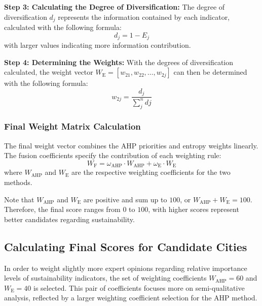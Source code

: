 \documentclass{mcmthesis}
\begin{document}
\textbf{Step 3: Calculating the Degree of Diversification:} The degree of diversification $d_j$ represents the information contained by each indicator, calculated with the following formula: 
\begin{equation} \label{eq:entropy_deg_of_diversification}
    d_j = 1 - E_j
\end{equation}
with larger values indicating more information contribution. 

\textbf{Step 4: Determining the Weights:} With the degrees of diversification calculated, the weight vector $W_\text{E}=[w_{21}, w_{22}, \dots, w_{2j}]$ can then be determined with the following formula:
\begin{equation} \label{eq:entropy_weights}
    w_{2j} = \frac{d_j}{\sum^n_{j} dj}
\end{equation}


\subsubsection{Final Weight Matrix Calculation} \label{subsubsec:weight_combination}

The final weight vector combines the AHP priorities and entropy weights linearly. The fusion coefficients specify the contribution of each weighting rule:
\begin{equation} \label{eq:weight_combination}
    W_\text{F} = \omega_\text{AHP} \cdot W_\text{AHP} + \omega_\text{E} \cdot W_\text{E}
\end{equation}
where $W_\text{AHP}$ and $W_\text{E}$ are the respective weighting coefficients for the two methods. 

Note that $W_\text{AHP}$ and $W_\text{E}$ are positive and sum up to $100$, or $W_\text{AHP} + W_\text{E} = 100$. Therefore, the final score ranges from $0$ to $100$, with higher scores represent better candidates regarding sustainability. 

\subsection{Calculating Final Scores for Candidate Cities}

In order to weight slightly more expert opinions regarding relative importance levels of sustainability indicators, the set of weighting coefficients $W_\text{AHP} = 60$ and $W_\text{E} = 40$ is selected. This pair of coefficients focuses more on semi-qualitative analysis, reflected by a larger weighting coefficient selection for the AHP method. 
\end{document}
